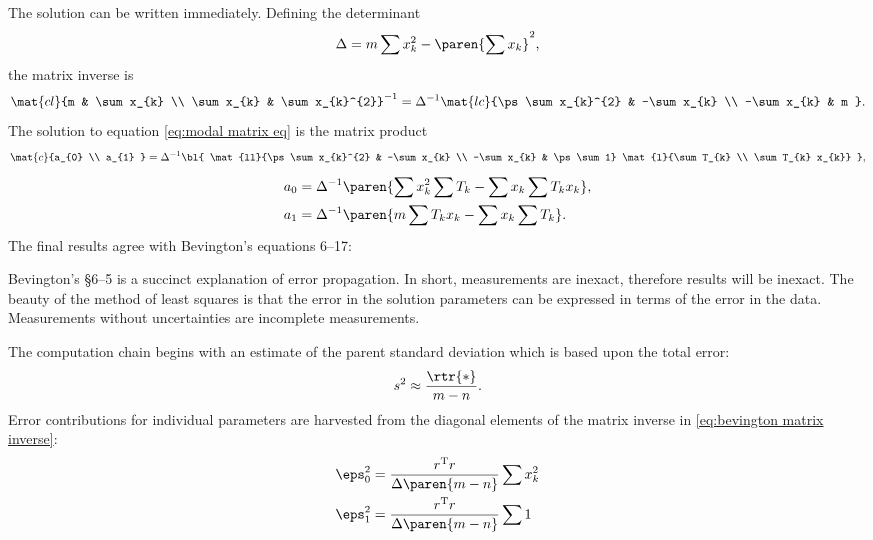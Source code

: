 The solution can be written immediately. Defining the determinant
  \begin{equation}   %
    \Delta = m \sum x_{k}^{2} - \paren{\sum x_{k}}^{2},
    \label{eq:det}
  \end{equation}
the matrix inverse is
  \begin{equation}   %
    \mat{cl}{m & \sum x_{k} \\ \sum x_{k} & \sum x_{k}^{2}}^{-1} = \Delta^{-1} 
    \mat{lc}{\ps \sum x_{k}^{2} & -\sum x_{k} \\ -\sum x_{k} & m } .
    \label{eq:bevington matrix inverse}
  \end{equation}
The solution to equation \eqref{eq:modal matrix eq} is the matrix product
  \begin{equation*}
    \mat{c}{a_{0} \\ a_{1} } = \Delta^{-1}
    \bl{
    \mat{ll}{\ps \sum x_{k}^{2} & -\sum x_{k} \\ -\sum x_{k} & \ps \sum 1}
    \mat{l}{\sum T_{k} \\ \sum T_{k} x_{k}}
    },
    \label{eqn:bevington solution product}
  \end{equation*}
  \begin{equation}
  \begin{split}
    a_{0} &= \Delta^{-1} \paren{\sum x_{k}^{2}\sum T_{k} - \sum x_{k}\sum T_{k} x_{k}}, \\
    a_{1} &= \Delta^{-1} \paren{m \sum T_{k} x_{k} - \sum x_{k}\sum T_{k}}.
  \label{eqn:bevington soln sum}
  \end{split}
  \end{equation}
The final results agree with Bevington's equations 6--17:

Bevington's \S 6--5 is a succinct explanation of error propagation. In short, measurements are inexact, therefore results will be inexact. The beauty of the method of least squares is that the error in the solution parameters can be expressed in terms of the error in the data. Measurements without uncertainties are incomplete measurements.

The computation chain begins with an estimate of the parent standard deviation which is based upon the total error:
  \begin{equation*}
    s^{2} \approx \frac{\rtr{*}} {m-n}.
  \end{equation*}
Error contributions for individual parameters are harvested from the diagonal elements of the matrix inverse in \eqref{eq:bevington matrix inverse}:
\begin{equation*}
  \begin{split}
    \eps_{0}^{2} &= \frac{r^{\mathrm{T}}r}{\Delta\paren{m-n}} \sum x_{k}^{2} \\
    \eps_{1}^{2} &= \frac{r^{\mathrm{T}}r}{\Delta\paren{m-n}} \sum 1 \\
  \end{split}
  \label{eqn:bevington error terms}
\end{equation*}
  
